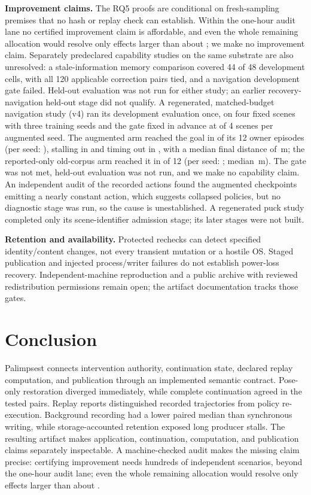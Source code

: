 \documentclass[10pt]{article}
\begin{document}
\textbf{Improvement claims.}
The RQ5 proofs are conditional on fresh-sampling premises that no hash or replay
check can establish. Within the one-hour audit lane no certified improvement
claim is affordable, and even the whole remaining allocation would resolve only
effects larger than about \AuditTotalRadius{}; we make no improvement claim. Separately predeclared
capability studies on the same substrate are also unresolved: a stale-information
memory comparison covered 44 of 48 development cells, with all 120 applicable
correction pairs tied, and a navigation
development gate failed. Held-out evaluation was not run for either study; an
earlier recovery-navigation held-out stage did not qualify.
A regenerated, matched-budget navigation study (v4) ran its development
evaluation once, on four fixed scenes with three training seeds and the gate
fixed in advance at \MaleVfourThreshold{} of 4 scenes per augmented seed. The
augmented arm reached the goal in \MaleVfourAugGoals{} of its 12 owner episodes
(per seed: \MaleVfourAugBySeed{}), stalling in \MaleVfourAugStalled{} and timing out in
\MaleVfourAugTimeLimit{}, with a median final distance of \MaleVfourAugMedianDistance{}\,m; the
reported-only old-corpus arm reached it in \MaleVfourOldGoals{} of 12
(per seed: \MaleVfourOldBySeed{}; median \MaleVfourOldMedianDistance{}\,m). The gate was not met, held-out
evaluation was not run, and we make no capability claim. An independent audit of
the recorded actions found the augmented checkpoints emitting a nearly constant
action, which suggests collapsed policies, but no diagnostic stage was run, so
the cause is unestablished. A regenerated puck study completed only its
scene-identifier admission stage; its later stages were not built.

\textbf{Retention and availability.}
Protected rechecks can detect specified identity/content changes, not every
transient mutation or a hostile OS. Staged publication and injected process/writer
failures do not establish power-loss recovery. Independent-machine reproduction
and a public archive with reviewed redistribution permissions remain open; the
artifact documentation tracks those gates.

\section{Conclusion}
Palimpsest connects intervention authority, continuation state, declared replay
computation, and publication through an implemented semantic contract.
Pose-only restoration diverged immediately, while complete continuation agreed
in the tested pairs. Replay reports distinguished recorded trajectories from
policy re-execution. Background recording had a lower paired median than
synchronous writing, while storage-accounted retention exposed long producer
stalls. The resulting artifact makes application, continuation, computation,
and publication claims separately inspectable. A machine-checked audit makes the
missing claim precise: certifying improvement needs hundreds of independent
scenarios, beyond the one-hour audit lane; even the whole remaining allocation
would resolve only effects larger than about \AuditTotalRadius{}.



\end{document}
